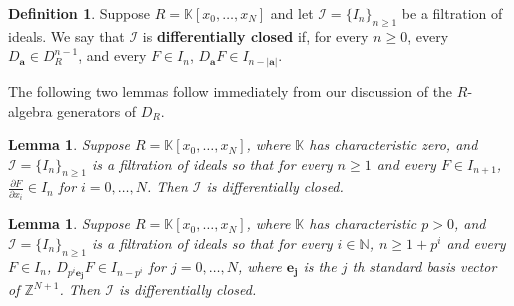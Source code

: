 \documentclass[12pt, reqno]{amsart}
\numberwithin{equation}{section}
\newcommand{\ba}{\mathbf{a}}
\newcommand{\N}{{\mathbb N}}
\newcommand{\Z}{{\mathbb Z}}
\newcommand{\kk}{\mathbb{K}}
\newcommand{\I}{{\mathcal I}}
\theoremstyle{plain} %
\newtheorem{lem}[thm]{Lemma}
\theoremstyle{definition}
\newtheorem{defn}[thm]{Definition}
\theoremstyle{remark}
\begin{document}
\begin{defn}\label{def:differentiallyclosedfiltration}
Suppose $R=\kk[x_0,\ldots,x_N]$ and let $\I=\{I_n\}_{n\ge 1}$ be a filtration of ideals.  We say that $\I$ is \textbf{differentially closed} if, for every $n\ge 0$, every $D_\ba\in D^{n-1}_R$, and every $F\in I_{n}$, $D_{\ba}F\in I_{n-|\ba|}$.
\end{defn}

The following two lemmas follow immediately from our discussion of the $R$-algebra generators of $D_R$.

\begin{lem}\label{lem:DiffClosedChar0}
Suppose $R=\kk[x_0,\ldots,x_N]$, where $\kk$ has characteristic zero, and $\I=\{I_n\}_{n\ge 1}$ is a filtration of ideals so that for every $n\ge 1$ and every $F\in I_{n+1}$, $\frac{\partial F}{\partial x_i}\in I_n$ for $i=0,\ldots,N$.  Then $\I$ is differentially closed.
\end{lem}

\begin{lem}\label{lem:p^iclosedisenough}\label{lem:DiffClosedCharP}
Suppose $R=\kk[x_0,\ldots,x_N]$, where $\kk$ has characteristic $p>0$, and $\I=\{I_n\}_{n\ge 1}$ is a filtration of ideals so that for every $i\in \N$, $n\ge 1+p^i$ and every $F\in I_{n}$, $D_{p^i\mathbf{e_j}}F\in I_{n-p^i}$ for $j=0,\ldots,N$, where $\mathbf{e_j}$ is the $j$ th standard basis vector of $\Z^{N+1}$.  Then $\I$ is differentially closed.
\end{lem}

\end{document}
